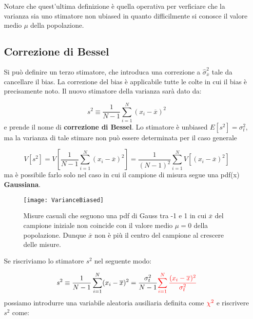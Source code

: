 \documentclass[11pt,a4paper]{book}
\begin{document}
\noindent Notare che quest'ultima definizione \`{e} quella operativa per verficiare che la varianza sia uno stimatore non ubiased in quanto difficilmente si conosce il valore medio $\mu$ della popolazione. 

\subsection{Correzione di Bessel}

Si pu\`{o} definire un terzo stimatore, che introduca una correzione a $\hat{\sigma}_{\overline{x}}^2$ tale da cancellare il bias. La correzione del bias \`{e} applicabile tutte le colte in cui il bias \`{e} precisamente noto. Il nuovo stimatore della varianza sar\`{a} dato da:

\begin{equation}
	s^2 \equiv \dfrac{1}{N-1} \sum_{i=1}^N (x_i - \overline{x})^2
\end{equation}
\newline
e prende il nome di \textbf{correzione di Bessel}.
\newline
Lo stimatore \`{e} unbiased $E[s^2] = \sigma_t^2$, ma la varianza di tale stimare non pu\`{o} essere determinata per il caso generale

\begin{equation*}
	V[s^2] = V[\dfrac{1}{N-1} \sum_{i=1}^N (x_i - \overline{x})^2] = \dfrac{1}{(N-1)^2} \sum_{i=1}^N V[(x_i - \overline{x})^2]
\end{equation*}
\newline
ma \`{e} possibile farlo solo nel caso in cui il campione di misura segue una pdf(x)\textbf{ Gaussiana}.
\begin{figure}[!ht]
\vspace{0.1in}
\texttt{[image: VarianceBiased]}	
\centering
\vspace{0.3in}
\caption{Misure casuali che seguono una pdf di Gauss tra -1 e 1 in cui $\overline{x}$ del campione iniziale non coincide con il valore medio $\mu = 0$ della popolazione. Dunque $\overline{x}$ non \`{e} pi\`{u} il centro del campione al crescere delle misure. }
\end{figure}

\noindent Se riscriviamo lo stimatore $s^2$ nel seguente modo:

\begin{equation*}
s^2 \equiv \dfrac{1}{N-1} \sum_{i=1}^N (x_i - \overline{x})^2 = \dfrac{\sigma_t^2}{N-1} \textcolor{red}{\sum_{i=1}^N \dfrac{(x_i - \overline{x})^2}{\sigma_t^2}}
\end{equation*}
possiamo introdurre una variabile aleatoria ausiliaria definita come $\textcolor{red}{\chi^2}$ e riscrivere $s^2$ come:
\end{document}
